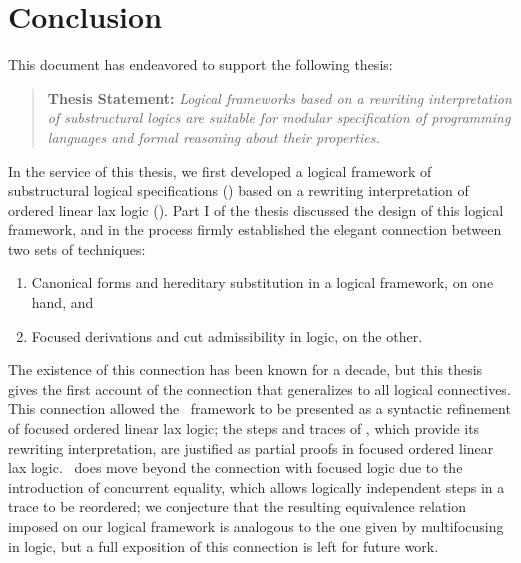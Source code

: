 \chapter{Conclusion}
\label{chapter-conclusion}

This document has endeavored to support the following thesis:
\smallskip
\begin{quote} {\bf Thesis Statement:} {\it Logical frameworks based on
    a rewriting interpretation of substructural logics are suitable
    for modular specification of programming languages and formal
    reasoning about their properties.}
\end{quote}
\bigskip


In the service of this thesis, we first developed a logical framework
of substructural logical specifications (\sls) based on a rewriting
interpretation of ordered linear lax logic (\ollll). Part I of the
thesis discussed the design of this logical framework, and in the
process firmly established the elegant connection between two sets of
techniques:

\smallskip
\begin{enumerate}
\item Canonical forms and hereditary
substitution in a logical framework, on one hand, and 
\item Focused derivations and cut
admissibility in logic, on the other.
\end{enumerate}

\smallskip
\noindent 
The existence of this connection has been known for a decade, but this
thesis gives the first account of the connection that generalizes to
all logical connectives. This connection allowed the \sls~framework to
be presented as a syntactic refinement of focused ordered linear lax
logic; the steps and traces of \sls, which provide its rewriting
interpretation, are justified as partial proofs in focused ordered
linear lax logic. \sls~does move beyond the connection with focused
logic due to the introduction of concurrent equality, which allows
logically independent steps in a trace to be reordered; we conjecture
that the resulting equivalence relation imposed on our logical
framework is analogous to the one given by multifocusing in logic, but
a full exposition of this connection is left for future work.


